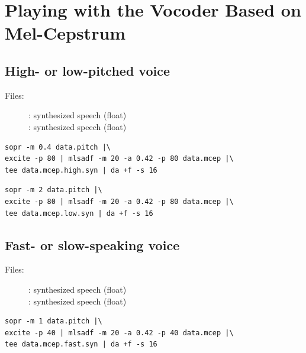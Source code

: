 \documentclass[a4paper,10pt]{article}
\begin{document}
\section{Playing with the Vocoder Based on Mel-Cepstrum}

\subsection{High- or low-pitched voice}

\begin{description}
\item[Files:]
  :
  synthesized speech (float)\\
  :
  synthesized speech (float)
\end{description}

\begin{verbatim}
sopr -m 0.4 data.pitch |\
excite -p 80 | mlsadf -m 20 -a 0.42 -p 80 data.mcep |\
tee data.mcep.high.syn | da +f -s 16
\end{verbatim}

\begin{verbatim}
sopr -m 2 data.pitch |\
excite -p 80 | mlsadf -m 20 -a 0.42 -p 80 data.mcep |\
tee data.mcep.low.syn | da +f -s 16
\end{verbatim}

\subsection{Fast- or slow-speaking voice}

\begin{description}
\item[Files:]
  :
  synthesized speech (float)\\
  :
  synthesized speech (float)
\end{description}

\begin{verbatim}
sopr -m 1 data.pitch |\
excite -p 40 | mlsadf -m 20 -a 0.42 -p 40 data.mcep |\
tee data.mcep.fast.syn | da +f -s 16
\end{verbatim}
\end{document}
